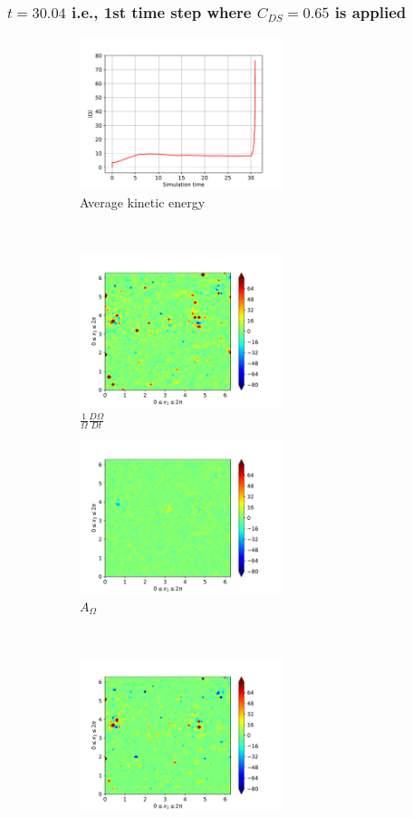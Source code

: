 \subsubsection{$t=30.04$ i.e., 1st time step where $C_{DS}=0.65$ is applied} 
\begin{figure}[H]
    \begin{subfigure}[H]{0.45\textwidth}
        \includegraphics[height=1.75in]{media/run-cds-65/enst-average1420}
        \caption{Average kinetic energy}
    \end{subfigure}
    ~
    \begin{subfigure}[H]{0.45\textwidth}
        \includegraphics[height=1.75in]{media/run-cds-65/enst-1420}
        \caption{$\frac{1}{\Omega} \frac{D \Omega}{Dt}$}
    \end{subfigure}
    \newline
    \begin{subfigure}{0.45\textwidth}
        \includegraphics[height=1.75in]{media/run-cds-65/A-enst-1420}
        \caption{$A_{\Omega}$}
    \end{subfigure}
    ~
    \begin{subfigure}{0.45\textwidth}
        \includegraphics[height=1.75in]{media/run-cds-65/Pi-enst-1420}

\end{subfigure}
\end{figure}

